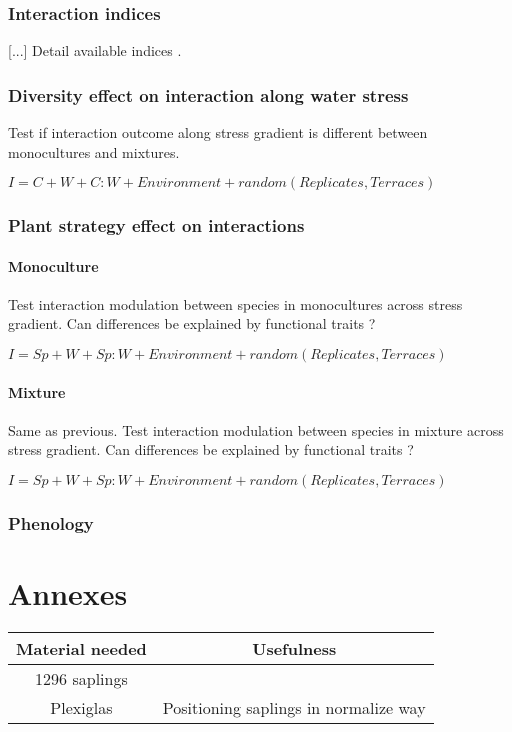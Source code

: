 \documentclass[12pt]{article} %
\begin{document}
\subsubsection{Interaction indices}
[...] Detail available indices \citep{Seifan2010}.

\subsubsection{Diversity effect on interaction along water stress}
Test if interaction outcome along stress gradient is different between monocultures and mixtures.

$I= C + W + C:W + Environment + random(Replicates,Terraces)$

\subsubsection{Plant strategy effect on interactions}

\paragraph{Monoculture}
Test interaction modulation between species in monocultures across stress gradient. Can differences be explained by functional traits ?

$I= Sp + W + Sp:W + Environment + random(Replicates,Terraces)$

\paragraph{Mixture}
Same as previous. Test interaction modulation between species in mixture across stress gradient. Can differences be explained by functional traits ?

$I= Sp + W + Sp:W + Environment + random(Replicates,Terraces)$

\subsubsection{Phenology}




\begin{spacing}{1.0}
%

\end{spacing}

\section{Annexes}

\begin{table}
\begin{center}
\begin{tabular}{cc}
Material needed & Usefulness \\
\hline
1296 saplings & \\
Plexiglas & Positioning saplings in normalize way\\

\end{tabular}
\end{center}
\end{table}
\end{document}
